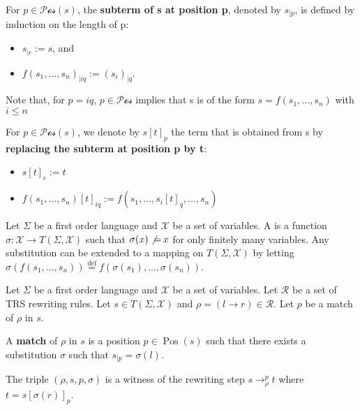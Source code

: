   \begin{definition}
    For $p \mathop{\in} \mathcal{Pos}(s)$, the \textbf{subterm of s at position p}, denoted by $s_{|p}$, is defined by induction on the length of p:
    \begin{itemize}
      \item $s_{|\epsilon} := s$, and
      \item $f(s_1,...,s_n)_{|iq} := \left(s_i\right)_{|q}$.
    \end{itemize} 
    
    Note that, for $p \mathop{=} iq$, $p \mathop{\in} \mathcal{Pos}$ implies that s is of the form $s \mathop{=} f(s_1,...,s_n)$ with $i \le n$
    
    For $p \mathop{\in} \mathcal{Pos}(s)$, we denote by $s[t]_p$ the term that is obtained from s by \textbf{replacing the subterm at position p by t}:
  \begin{itemize}
    \item $s[t]_\epsilon := t$
    \item $f(s_1,...,s_n)[t]_{iq} := f(s_1,...,s_i[t]_{q},...,s_n)$
  \end{itemize}
 
  \end{definition}
   
  \begin{definition}[Substitution]
    Let $\Sigma$ be a first order language and $\mathcal{X}$ be a set of variables.
    A  is a function $\sigma : \mathcal{X} \mathop{\rightarrow} T(\Sigma, \mathcal{X})$ such that $\sigma(x) \not \mathop{=} x$ for only finitely many variables. Any substitution can be extended to a mapping on $T(\Sigma,\mathcal{X})$ by letting $\sigma(f(s_1,...,s_n)) \overset{\operatorname{def}}{=}f(\sigma(s_1),...,\sigma(s_n))$.
  \end{definition}

   
  \begin{definition}
    \label{def:trs:rewriting}
    Let $\Sigma$ be a first order language and $\mathcal{X}$ be a set of variables. Let $\mathcal{R}$ be a set of TRS rewriting rules. Let $s \mathop{\in} T(\Sigma, \mathcal{X})$ and $\rho \mathop{=} (l \mathop{\to} r) \mathop{\in} \mathcal{R}$. Let $p$ be a match of $\rho$ in $s$.

      A \textbf{match} of $\rho$ in $s$ is a position $p \mathop{\in} \operatorname{Pos}(s)$ such that there exists a substitution $\sigma$ such that $s_{|p} \mathop{=} \sigma(l)$.

    The triple $(\rho, s, p, \sigma)$ is a witness of the rewriting step $s \mathop{\to} _\rho^p t$ where $t \mathop{=} s[\sigma(r)]_p$.
  \end{definition}
  
